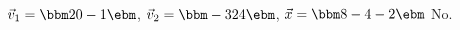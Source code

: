 {$\vec{v}_1 = \bbm 2\\0\\-1\ebm$, $\vec{v}_2 = \bbm -3\\2\\4\ebm$, $\vec{x} = \bbm 8\\-4\\-2\ebm$}
{No.}
